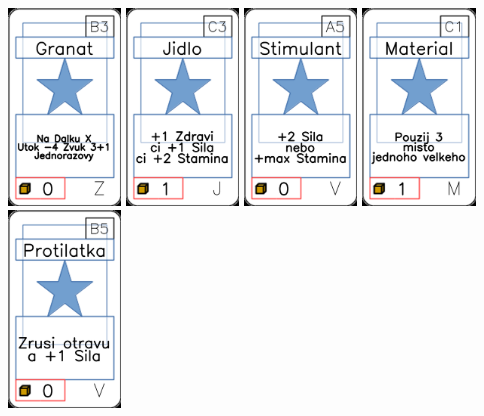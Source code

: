 \documentclass[a4paper]{article}
\begin{document}
	\includegraphics[width=3.0cm]{img-1_97}
	\includegraphics[width=3.0cm]{img-1_12}
	\includegraphics[width=3.0cm]{img-1_64}
	\includegraphics[width=3.0cm]{img-1_40}
	\includegraphics[width=3.0cm]{img-1_69}
\end{document}

